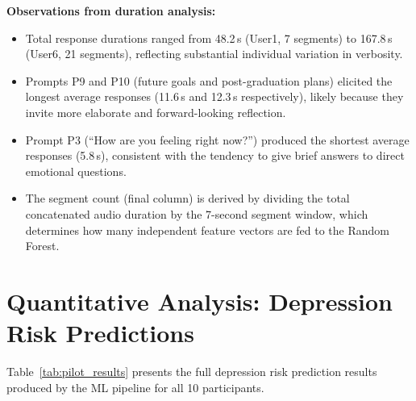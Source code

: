 \noindent\textbf{Observations from duration analysis:}
\begin{itemize}
    \item Total response durations ranged from 48.2\,s (User1, 7 segments) to 167.8\,s (User6, 21 segments), reflecting substantial individual variation in verbosity.
    \item Prompts P9 and P10 (future goals and post-graduation plans) elicited the longest average responses (11.6\,s and 12.3\,s respectively), likely because they invite more elaborate and forward-looking reflection.
    \item Prompt P3 (``How are you feeling right now?'') produced the shortest average responses (5.8\,s), consistent with the tendency to give brief answers to direct emotional questions.
    \item The segment count (final column) is derived by dividing the total concatenated audio duration by the 7-second segment window, which determines how many independent feature vectors are fed to the Random Forest.
\end{itemize}

\section{Quantitative Analysis: Depression Risk Predictions}

Table~\ref{tab:pilot_results} presents the full depression risk prediction results produced by the ML pipeline for all 10 participants.

